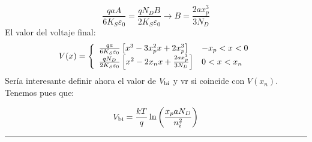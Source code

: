 \begin{equation*}
    \frac{qa A}{6K_S\varepsilon_0} = \frac{qN_D B}{2K_S\varepsilon_0} \rightarrow B = \frac{2 a x_p^3}{3 N_D}
\end{equation*}
El valor del voltaje final: 
\begin{equation*}
    V (x) =  \left\lbrace \begin{array}{ll}
        \frac{qa}{6K_S\varepsilon_0} \left[ x^3 - 3x_p^2 x + 2x_p^3 \right] & -x_p < x < 0  \\ 
        \frac{qN_D}{2K_S\varepsilon_0} \left[ x^2 - 2x_n x + \frac{2 a x_p^3}{3 N_D} \right] & 0 < x < x_n  
    \end{array} \right.
\end{equation*}
Sería interesante definir ahora el valor de $V_{\text{bi}}$ y vr si coincide con $V(x_n)$. Tenemos pues que: 

\begin{equation}
    V_{\text{bi}} = \frac{kT}{q} \ln \left( \frac{x_p a N_D}{n_i^2} \right)
\end{equation}


\rule{\textwidth}{0.1pt} \\[2pt]